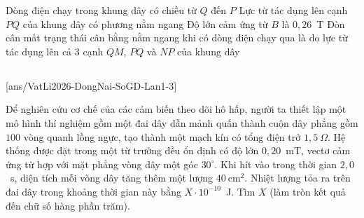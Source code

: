 \begin{ex}
\begin{center}
		\end{center}
		\choiceTFt
		{\True Dòng điện chạy trong khung dây có chiều từ $Q$ đến $P$}
		{Lực từ tác dụng lên cạnh $PQ$ của khung dây có phương nằm ngang}
		{\True Độ lớn cảm ứng từ $B$ là $0{,}26$~T}
		{Đòn cân mất trạng thái cân bằng nằm ngang khi có dòng điện chạy qua là do lực từ tác dụng lên cả $3$ cạnh $QM$, $PQ$ và $NP$ của khung dây}
	\end{ex}

	\subsection*{}
	\setcounter{ex}{0}
	[ans/VatLi2026-DongNai-SoGD-Lan1-3]

	\begin{ex}%
		Để nghiên cứu cơ chế của các cảm biến theo dõi hô hấp, người ta thiết lập một mô hình thí nghiệm gồm một đai dây dẫn mảnh quấn thành cuộn dây phẳng gồm $100$ vòng quanh lồng ngực, tạo thành một mạch kín có tổng điện trở $1{,}5~\Omega$. Hệ thống được đặt trong một từ trường đều ổn định có độ lớn $0{,}20$~mT, vectơ cảm ứng từ hợp với mặt phẳng vòng dây một góc $30^\circ$. Khi hít vào trong thời gian $2{,}0$~s, diện tích mỗi vòng dây tăng thêm một lượng $40~\text{cm}^2$. Nhiệt lượng tỏa ra trên đai dây trong khoảng thời gian này bằng $X\cdot 10^{-10}$~J. Tìm $X$ (làm tròn kết quả đến chữ số hàng phần trăm).
		\par
	\end{ex}

